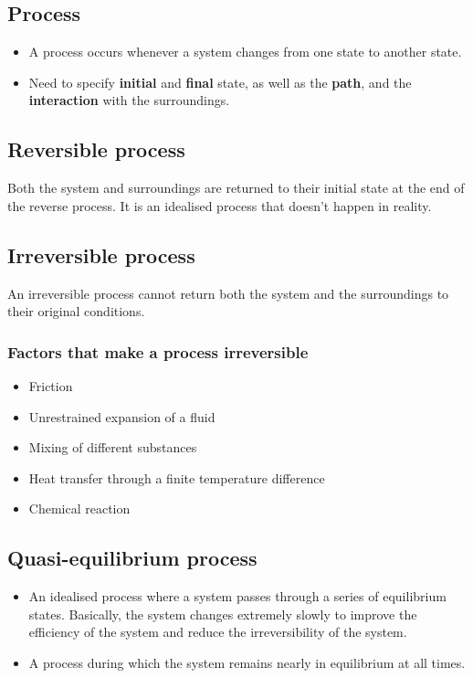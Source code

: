 \documentclass[11pt]{article}
\begin{document}
\subsection{Process}
\label{sec:org92c1917}
\begin{itemize}
\item A process occurs whenever a system changes from one state to another state.
\item Need to specify \textbf{initial} and \textbf{final} state, as well as the \textbf{path}, and the \textbf{interaction} with the surroundings.
\end{itemize}

\subsection{Reversible process}
\label{sec:orgac7bd8e}
Both the system and surroundings are returned to their initial state at the end of the reverse process. It is an idealised process that doesn't happen in reality.

\newpage

\subsection{Irreversible process}
\label{sec:org5913850}
An irreversible process cannot return both the system and the surroundings to their original conditions.

\subsubsection{Factors that make a process irreversible}
\label{sec:org560d1c3}
\begin{itemize}
\item Friction
\item Unrestrained expansion of a fluid
\item Mixing of different substances
\item Heat transfer through a finite temperature difference
\item Chemical reaction
\end{itemize}

\subsection{Quasi-equilibrium process}
\label{sec:org4abd280}
\begin{itemize}
\item An idealised process where a system passes through a series of equilibrium states. Basically, the system changes extremely slowly to improve the efficiency of the system and reduce the irreversibility of the system.
\item A process during which the system remains nearly in equilibrium at all times.
\end{itemize}
\end{document}
